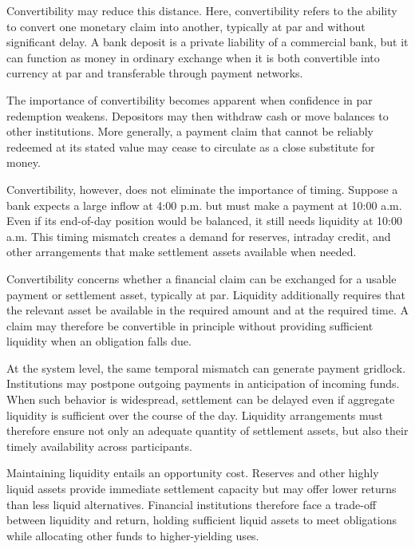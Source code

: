 Convertibility may reduce this distance. Here, convertibility refers to the ability to convert one monetary claim into another, typically at par and without significant delay. A bank deposit is a private liability of a commercial bank, but it can function as money in ordinary exchange when it is both convertible into currency at par and transferable through payment networks.

The importance of convertibility becomes apparent when confidence in par redemption weakens. Depositors may then withdraw cash or move balances to other institutions. More generally, a payment claim that cannot be reliably redeemed at its stated value may cease to circulate as a close substitute for money.

Convertibility, however, does not eliminate the importance of timing. Suppose a bank expects a large inflow at 4:00 p.m. but must make a payment at 10:00 a.m. Even if its end-of-day position would be balanced, it still needs liquidity at 10:00 a.m. This timing mismatch creates a demand for reserves, intraday credit, and other arrangements that make settlement assets available when needed.


\begin{tcolorbox}[
  enhanced,
  breakable,
  colback=white,
  colframe=FinanceBlue,
  boxrule=0.7pt,
  sharp corners,
  borderline west={2.2pt}{0pt}{FinanceBlue},
 title=\textbf{Financial Perspective: Convertibility Is Not Liquidity},
  coltitle=white,
  colbacktitle=FinanceBlue,
  fonttitle=\bfseries,
  before skip=1.2em,
  after skip=1.2em
]
Convertibility concerns whether a financial claim can be exchanged for a usable payment or settlement asset, typically at par. Liquidity additionally requires that the relevant asset be available in the required amount and at the required time. A claim may therefore be convertible in principle without providing sufficient liquidity when an obligation falls due.
\end{tcolorbox}

At the system level, the same temporal mismatch can generate payment gridlock. Institutions may postpone outgoing payments in anticipation of incoming funds. When such behavior is widespread, settlement can be delayed even if aggregate liquidity is sufficient over the course of the day. Liquidity arrangements must therefore ensure not only an adequate quantity of settlement assets, but also their timely availability across participants.

Maintaining liquidity entails an opportunity cost. Reserves and other highly liquid assets provide immediate settlement capacity but may offer lower returns than less liquid alternatives. Financial institutions therefore face a trade-off between liquidity and return, holding sufficient liquid assets to meet obligations while allocating other funds to higher-yielding uses.

